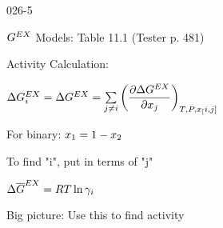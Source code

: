 \begin{mitframe}{026-5}

 	
    \begin{listone}
 
    	\item $\gibbs^{\exfunc}$ Models: Table 11.1 (Tester p. 481)
        
        \item Activity Calculation:
    
    	\begin{listtwo}
        
        	\item $\iipf\gibbs_{\state}^{\exfunc}=\iipf\gibbs^{\exfunc}=\sum\limits_{j\neq{i}}\bigg(\dfrac{\partial\iipf\gibbs^{\exfunc}}{\partial\specfrac{j}}\bigg)_{\Temp,\p,\specfrac[i,j]}$    
                        
            \begin{listthree}

				\item For binary: $\specfrac{1}=1-\specfrac{2}$
                
                \item To find "i", put in terms of "j"
	
			\end{listthree}
            
            \item$\iipf\overline{\gibbs}^{\exfunc}=\gasconst\Temp\ln\actcoeff$

		\end{listtwo} 
        
        \item Big picture: Use this to find activity
        
\end{listone}        
        
\end{mitframe}